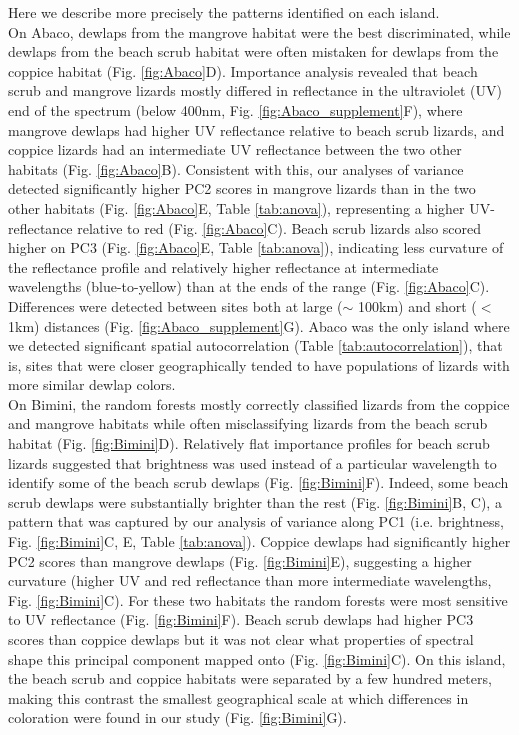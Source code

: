 Here we describe more precisely the patterns identified on each island.\\

On Abaco, dewlaps from the mangrove habitat were the best discriminated, while dewlaps from the beach scrub habitat were often mistaken for dewlaps from the coppice habitat (Fig. \ref{fig:Abaco}D). Importance analysis revealed that beach scrub and mangrove lizards mostly differed in reflectance in the ultraviolet (UV) end of the spectrum (below 400nm, Fig. \ref{fig:Abaco_supplement}F), where mangrove dewlaps had higher UV reflectance relative to beach scrub lizards, and coppice lizards had an intermediate UV reflectance between the two other habitats (Fig. \ref{fig:Abaco}B). Consistent with this, our analyses of variance detected significantly higher PC2 scores in mangrove lizards than in the two other habitats (Fig. \ref{fig:Abaco}E, Table \ref{tab:anova}), representing a higher UV-reflectance relative to red (Fig. \ref{fig:Abaco}C). Beach scrub lizards also scored higher on PC3 (Fig. \ref{fig:Abaco}E, Table \ref{tab:anova}), indicating less curvature of the reflectance profile and relatively higher reflectance at intermediate wavelengths (blue-to-yellow) than at the ends of the range (Fig. \ref{fig:Abaco}C). Differences were detected between sites both at large ($\sim$ 100km) and short ($<$ 1km) distances (Fig. \ref{fig:Abaco_supplement}G). Abaco was the only island where we detected significant spatial autocorrelation (Table \ref{tab:autocorrelation}), that is, sites that were closer geographically tended to have populations of lizards with more similar dewlap colors.\\

On Bimini, the random forests mostly correctly classified lizards from the coppice and mangrove habitats while often misclassifying lizards from the beach scrub habitat (Fig. \ref{fig:Bimini}D). Relatively flat importance profiles for beach scrub lizards suggested that brightness was used instead of a particular wavelength to identify some of the beach scrub dewlaps (Fig. \ref{fig:Bimini}F). Indeed, some beach scrub dewlaps were substantially brighter than the rest (Fig. \ref{fig:Bimini}B, C), a pattern that was captured by our analysis of variance along PC1 (i.e. brightness, Fig. \ref{fig:Bimini}C, E, Table \ref{tab:anova}). Coppice dewlaps had significantly higher PC2 scores than mangrove dewlaps (Fig. \ref{fig:Bimini}E), suggesting a higher curvature (higher UV and red reflectance than more intermediate wavelengths, Fig. \ref{fig:Bimini}C). For these two habitats the random forests were most sensitive to UV reflectance (Fig. \ref{fig:Bimini}F). Beach scrub dewlaps had higher PC3 scores than coppice dewlaps but it was not clear what properties of spectral shape this principal component mapped onto (Fig. \ref{fig:Bimini}C). On this island, the beach scrub and coppice habitats were separated by a few hundred meters, making this contrast the smallest geographical scale at which differences in coloration were found in our study (Fig. \ref{fig:Bimini}G).\\

